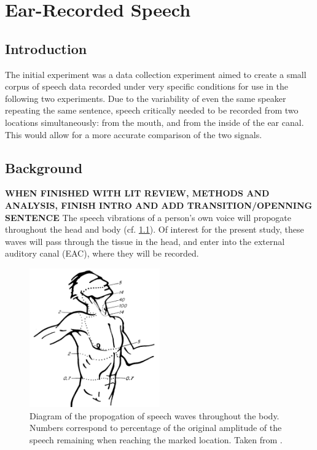 \documentclass[dissertation,copyright]{uathesis}
\begin{document}




 





\chapter{Ear-Recorded Speech\label{chapter2}}


\section{Introduction}

The initial experiment was a data collection experiment aimed to create a small corpus of speech data recorded under very specific conditions for use in the following two experiments.  Due to the variability of even the same speaker repeating the same sentence, speech critically needed to be recorded from two locations simultaneously: from the mouth, and from the inside of the ear canal.  This would allow for a more accurate comparison of the two signals.

\section{Background}

\textbf{WHEN FINISHED WITH LIT REVIEW, METHODS AND ANALYSIS, FINISH INTRO AND ADD TRANSITION/OPENNING SENTENCE}
The speech vibrations of a person's own voice will propogate throughout the head and body (cf. \ref{fig:bekesyBodyTransfer}).  Of interest for the present study, these waves will pass through the tissue in the head, and enter into the external auditory canal (EAC), where they will be recorded.

\begin{figure}
\centering
  \includegraphics[width=0.5\textwidth]{figure/bekesy60-3b.png}
  \caption{Diagram of the propogation of speech waves throughout the body. Numbers correspond to percentage of the original amplitude of the speech remaining when reaching the marked location. Taken from \cite{bekesy:60}.}
  \label{fig:bekesyBodyTransfer}
\end{figure}
\end{document}
